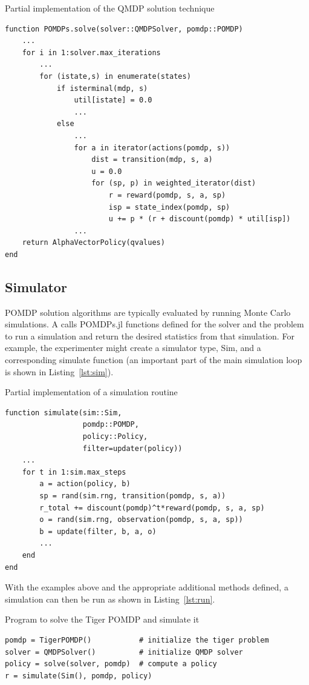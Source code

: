 \begin{lstfloat}
    \caption{Partial implementation of the QMDP solution technique} \label{lst:qmdp}    
\begin{lstlisting}
function POMDPs.solve(solver::QMDPSolver, pomdp::POMDP)
    ...
    for i in 1:solver.max_iterations
        ...
        for (istate,s) in enumerate(states)
            if isterminal(mdp, s)
                util[istate] = 0.0
                ...
            else
                ...
                for a in iterator(actions(pomdp, s))
                    dist = transition(mdp, s, a)
                    u = 0.0
                    for (sp, p) in weighted_iterator(dist)
                        r = reward(pomdp, s, a, sp)
                        isp = state_index(pomdp, sp)
                        u += p * (r + discount(pomdp) * util[isp])
                ...
    return AlphaVectorPolicy(qvalues)
end
\end{lstlisting}
\end{lstfloat}

\subsection{Simulator}

POMDP solution algorithms are typically evaluated by running Monte Carlo simulations.
A  calls POMDPs.jl functions defined for the solver and the problem to run a simulation and return the desired statistics from that simulation.
For example, the experimenter might create a simulator type, {\ttfamily Sim}, and a corresponding {\ttfamily simulate} function (an important part of the main simulation loop is shown in Listing~\ref{lst:sim}).

\begin{lstfloat}
    \caption{Partial implementation of a simulation routine} \label{lst:sim}   
\begin{lstlisting}
function simulate(sim::Sim,
                  pomdp::POMDP,
                  policy::Policy,
                  filter=updater(policy))
    ...
    for t in 1:sim.max_steps
        a = action(policy, b)
        sp = rand(sim.rng, transition(pomdp, s, a))
        r_total += discount(pomdp)^t*reward(pomdp, s, a, sp)
        o = rand(sim.rng, observation(pomdp, s, a, sp))
        b = update(filter, b, a, o)
        ...
    end
end
\end{lstlisting}
\end{lstfloat}

With the examples above and the appropriate additional methods defined, a simulation can then be run as shown in Listing~\ref{lst:run}. 
\begin{lstfloat}
    \caption{Program to solve the Tiger POMDP and simulate it} \label{lst:run}
\begin{lstlisting}
pomdp = TigerPOMDP()           # initialize the tiger problem
solver = QMDPSolver()          # initialize QMDP solver
policy = solve(solver, pomdp)  # compute a policy
r = simulate(Sim(), pomdp, policy)
\end{lstlisting}
\end{lstfloat}


